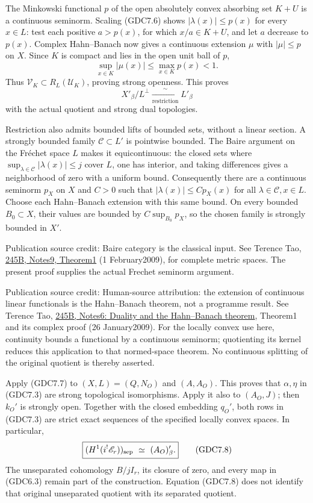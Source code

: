 The Minkowski functional \(p\) of the open absolutely convex absorbing
set \(K+U\) is a continuous seminorm. Scaling (GDC7.6) shows
\(|\lambda(x)|\le p(x)\) for every \(x\in L\): test each positive
\(a>p(x)\), for which \(x/a\in K+U\), and let \(a\) decrease to
\(p(x)\). Complex Hahn--Banach now gives a continuous extension \(\mu\)
with \(|\mu|\le p\) on \(X\). Since \(K\) is compact and lies in the
open unit ball of \(p\), \[
\sup_{x\in K}|\mu(x)|\le\max_{x\in K}p(x)<1.
\] Thus \(\mathcal V_K\subset R_L(\mathcal U_K)\), proving strong
openness. This proves \[
X'_\beta/L^\perp\xrightarrow[\mathrm{restriction}]{\ \sim\ }L'_\beta
\tag{GDC7.7}
\] with the actual quotient and strong dual topologies.

Restriction also admits bounded lifts of bounded sets, without a linear
section. A strongly bounded family \(\mathcal C\subset L'\) is pointwise
bounded. The Baire argument on the Fréchet space \(L\) makes it
equicontinuous: the closed sets where
\(\sup_{\lambda\in\mathcal C}|\lambda(x)|\le j\) cover \(L\), one has
interior, and taking differences gives a neighborhood of zero with a
uniform bound. Consequently there are a continuous seminorm \(p_X\) on
\(X\) and \(C>0\) such that \(|\lambda(x)|\le C p_X(x)\) for all
\(\lambda\in\mathcal C,x\in L\). Choose each Hahn--Banach extension with
this same bound. On every bounded \(B_0\subset X\), their values are
bounded by \(C\sup_{B_0}p_X\), so the chosen family is strongly bounded
in \(X'\).

Publication source credit: Baire category is the classical input. See
Terence Tao,
\href{https://terrytao.wordpress.com/2009/02/01/245b-notes-9-the-baire-category-theorem-and-its-banach-space-consequences/}{245B,
Notes9, Theorem1} (1 February2009), for complete metric spaces. The
present proof supplies the actual Frechet seminorm argument.

Publication source credit: Human-source attribution: the extension of
continuous linear functionals is the Hahn--Banach theorem, not a
programme result. See Terence Tao,
\href{https://terrytao.wordpress.com/2009/01/26/245b-notes-6-duality-and-the-hahn-banach-theorem/}{245B,
Notes6: Duality and the Hahn--Banach theorem}, Theorem1 and its complex
proof (26 January2009). For the locally convex use here, continuity
bounds a functional by a continuous seminorm; quotienting its kernel
reduces this application to that normed-space theorem. No continuous
splitting of the original quotient is thereby asserted.

Apply (GDC7.7) to \((X,L)=(Q,N_O)\) and \((A,A_O)\). This proves that
\(\alpha,\eta\) in (GDC7.3) are strong topological isomorphisms. Apply
it also to \((A_O,J)\); then \(k_O'\) is strongly open. Together with
the closed embedding \(q_O'\), both rows in (GDC7.3) are strict exact
sequences of the specified locally convex spaces. In particular, \[
\boxed{(H^1(i^!\mathscr E_r))_{\rm sep}
\ \simeq\ (A_O)'_\beta.}
\tag{GDC7.8}
\] The unseparated cohomology \(B/jI_r\), its closure of zero, and every
map in (GDC6.3) remain part of the construction. Equation (GDC7.8) does
not identify that original unseparated quotient with its separated
quotient.


